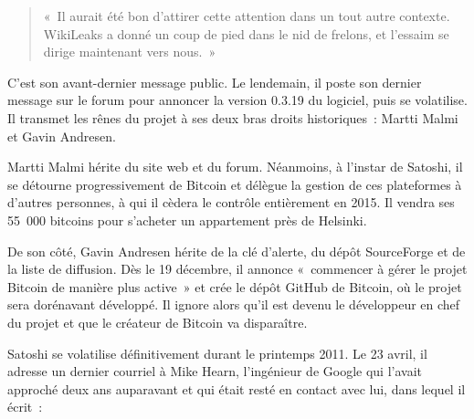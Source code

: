 \begin{quote}
«~Il aurait été bon d'attirer cette attention dans un tout autre contexte. WikiLeaks a donné un coup de pied dans le nid de frelons, et l'essaim se dirige maintenant vers nous.~»
\end{quote}

C'est son avant-dernier message public. Le lendemain, il poste son dernier message sur le forum pour annoncer la version 0.3.19 du logiciel, puis se volatilise. Il transmet les rênes du projet à ses deux bras droits historiques~: Martti Malmi et Gavin Andresen.

Martti Malmi hérite du site web et du forum. Néanmoins, à l'instar de Satoshi, il se détourne progressivement de Bitcoin et délègue la gestion de ces plateformes à d'autres personnes, à qui il cèdera le contrôle entièrement en 2015. Il vendra ses 55~000 bitcoins pour s'acheter un appartement près de Helsinki.

De son côté, Gavin Andresen hérite de la clé d'alerte, du dépôt SourceForge et de la liste de diffusion. Dès le 19 décembre, il annonce «~commencer à gérer le projet Bitcoin de manière plus active~» et crée le dépôt GitHub de Bitcoin, où le projet sera dorénavant développé. Il ignore alors qu'il est devenu le développeur en chef du projet et que le créateur de Bitcoin va disparaître.

Satoshi se volatilise définitivement durant le printemps 2011. Le 23 avril, il adresse un dernier courriel à Mike Hearn, l'ingénieur de Google qui l'avait approché deux ans auparavant et qui était resté en contact avec lui, dans lequel il écrit~:

